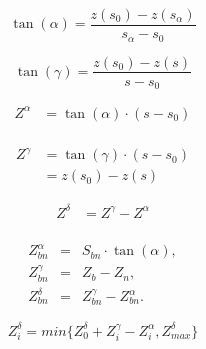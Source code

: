 \documentclass[10pt,a4paper]{article}
\begin{document}
	
	\begin{equation}
		\tan(\alpha) = \frac{z(s_0) - z(s_{\alpha})}{s_{\alpha} - s_0}
	\end{equation}

	\begin{equation}
		\tan(\gamma) = \frac{z(s_0) - z(s)}{s - s_0}
	\end{equation}
	
	\begin{equation}
		\begin{split}
			Z^{\alpha} & = \tan(\alpha) \cdot (s - s_0) \\
		\end{split}
	\end{equation}

	\begin{equation}
		\begin{split}
			Z^{\gamma} & = \tan(\gamma) \cdot (s - s_0) \\
			& = z(s_0) - z(s)
		\end{split}
	\end{equation}

	\begin{equation}
		\begin{split}
			Z^{\delta} & = Z^{\gamma} - Z^{\alpha} \\
		\end{split}
	\end{equation}
	
	\begin{eqnarray}\label{equation:intensity} 
		Z^{\alpha}_{bn} &=& S_{bn} \cdot \tan(\alpha), \\
		Z^{\gamma}_{bn} &=& Z_b -Z_{n}, \\
		Z^\delta_{bn}  &=& Z^{\gamma}_{bn} - Z^{\alpha}_{bn}.
	\end{eqnarray}

	\begin{equation}\label{equation:intensity_min}
		Z^\delta_{i} = min\{ Z^{\delta}_0 + Z^{\gamma}_i - Z^{\alpha}_i, Z^\delta_{max}  \}
	\end{equation}



\end{document}
